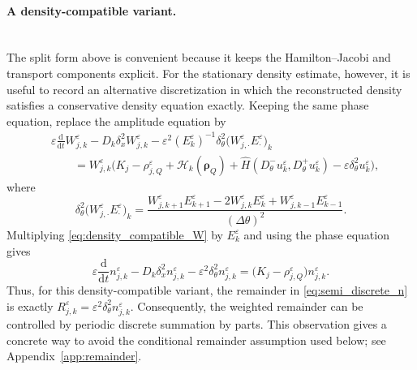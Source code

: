\documentclass[11pt]{article}
\begin{document}
\paragraph{A density-compatible variant.}\mbox{}\\
The split form above is convenient because it keeps the Hamilton--Jacobi and
transport components explicit. For the stationary density estimate, however,
it is useful to record an alternative discretization in which the reconstructed
density satisfies a conservative density equation exactly. Keeping the same
phase equation, replace the amplitude equation by
\begin{equation}\label{eq:density_compatible_W}
\begin{aligned}
&\varepsilon
\frac{\mathrm d}{\mathrm dt}W_{j,k}^\varepsilon
-
D_k\delta_x^2W_{j,k}^\varepsilon
-
\varepsilon^2(E_k^\varepsilon)^{-1}
\delta_\theta^2
\bigl(W_{j,\cdot}^\varepsilon E_\cdot^\varepsilon\bigr)_k
\\
&\qquad =
W_{j,k}^\varepsilon
\bigl(
K_j-\rho_{j,Q}^\varepsilon
+\mathcal H_k(\boldsymbol\rho_Q)
+\widehat H(D_\theta^-u_k^\varepsilon,D_\theta^+u_k^\varepsilon)
-\varepsilon\delta_\theta^2u_k^\varepsilon
\bigr),
\end{aligned}
\end{equation}
where
\[
\delta_\theta^2
\bigl(W_{j,\cdot}^\varepsilon E_\cdot^\varepsilon\bigr)_k
=
\frac{
W_{j,k+1}^\varepsilon E_{k+1}^\varepsilon
-2W_{j,k}^\varepsilon E_k^\varepsilon
+W_{j,k-1}^\varepsilon E_{k-1}^\varepsilon
}{(\Delta\theta)^2} .
\]
Multiplying \eqref{eq:density_compatible_W} by \(E_k^\varepsilon\) and using
the phase equation gives
\begin{equation}\label{eq:density_compatible_n}
\varepsilon\frac{\mathrm d}{\mathrm dt} n_{j,k}^\varepsilon
-
D_k\delta_x^2 n_{j,k}^\varepsilon
-
\varepsilon^2\delta_\theta^2 n_{j,k}^\varepsilon
=
\bigl(K_j-\rho_{j,Q}^\varepsilon\bigr)n_{j,k}^\varepsilon .
\end{equation}
Thus, for this density-compatible variant, the remainder in
\eqref{eq:semi_discrete_n} is exactly
\(R_{j,k}^\varepsilon=\varepsilon^2\delta_\theta^2n_{j,k}^\varepsilon\).
Consequently, the weighted remainder can be controlled by periodic discrete
summation by parts. This observation gives a concrete way to avoid the
conditional remainder assumption used below; see
Appendix~\ref{app:remainder}.



\end{document}
